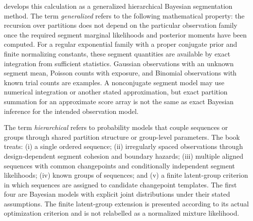 \BayesBreak develops this calculation as a generalized hierarchical Bayesian segmentation method.
The term \emph{generalized} refers to the following mathematical property: the recursion over
partitions does not depend on the particular observation family once the required segment marginal
likelihoods and posterior moments have been computed. For a regular exponential family with a
proper conjugate prior and finite normalizing constants, these segment quantities are available by
exact integration from sufficient statistics. Gaussian observations with an unknown segment mean,
Poisson counts with exposure, and Binomial observations with known trial counts are examples. A
nonconjugate segment model may use numerical integration or another stated approximation, but exact
partition summation for an approximate score array is not the same as exact Bayesian inference for
the intended observation model.

The term \emph{hierarchical} refers to probability models that couple sequences or groups through
shared partition structure or group-level parameters. The book treats: (i) a single ordered
sequence; (ii) irregularly spaced observations through design-dependent segment cohesion and
boundary hazards; (iii) multiple aligned sequences with common changepoints and conditionally
independent segment likelihoods; (iv) known groups of sequences; and (v) a finite latent-group
criterion in which sequences are assigned to candidate changepoint templates. The first four are
Bayesian models with explicit joint distributions under their stated assumptions. The finite
latent-group extension is presented according to its actual optimization criterion and is not
relabelled as a normalized mixture likelihood.

